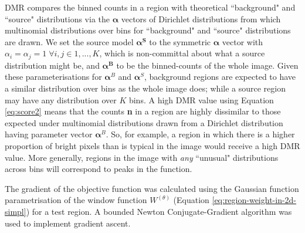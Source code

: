\documentclass[
    ,final            %
  ]
  {aipproc}
\begin{document}
DMR compares the binned counts in a region with theoretical ``background" and ``source" distributions via the $\boldsymbol{\alpha}$ vectors of Dirichlet distributions from which multinomial distributions over bins for ``background" and ``source" distributions are drawn.
We set the source model $\boldsymbol{\alpha^S}$ to the symmetric
$\boldsymbol{\alpha}$ vector with $\alpha_i = \alpha_j = 1 \; \forall
i,j \in 1,...,K$, which is non-committal about what a source
distribution might be, and $\boldsymbol{\alpha^B}$ to be the binned-counts of the whole image. %
Given these parameterisations for $\boldsymbol{\alpha}^B$ and $\boldsymbol{\alpha}^S$, background regions are expected to have a similar distribution over bins as the whole image does; while a source region may have any distribution over $K$ bins. A high DMR value using Equation \ref{eq:score2} means that the counts \textbf{n} in a region are highly dissimilar to those expected under multinomial distributions drawn from a Dirichlet distribution having parameter vector $\boldsymbol{\alpha}^B$. So, for example, a region in which there is a higher proportion of bright pixels than is typical in the image would receive a high DMR value. More generally, regions in the image with \textit{any} ``unusual" distributions across bins will correspond to peaks in the function.


The gradient of the objective function was calculated using the Gaussian function parametrisation of the window function $W^{(\theta)}$ (Equation \ref{eq:region-weight-in-2d-simpl}) for a test region. A bounded Newton Conjugate-Gradient algorithm 
\cite{scipy} was used to implement gradient ascent. 
\end{document}
